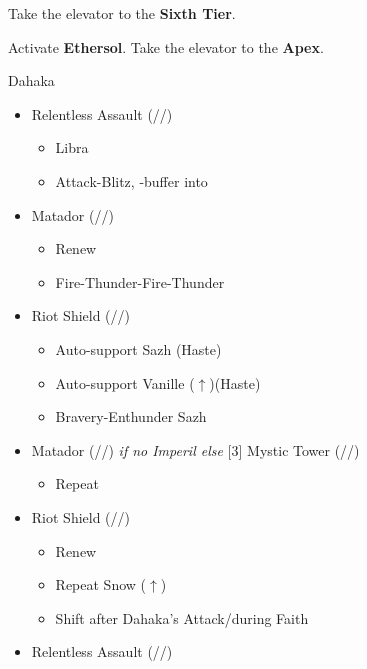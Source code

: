 	\renewcommand{\first}{[1] Riot Shield (\syn/\sen/\rav)}
	\renewcommand{\second}{[2] Relentless Assault (\com/\rav/\rav)}
	\renewcommand{\third}{[3] Mystic Tower (\rav/\sen/\rav)}
	\renewcommand{\fourth}{[4] Aggression (\com/\com/\rav)}
	\renewcommand{\fifth}{[5] Matador (\rav/\sen/\sab)}
	\renewcommand{\sixth}{[6] Aggression (\com/\com/\rav)}

	Take the elevator to the \textbf{Sixth Tier}.

	Activate \textbf{Ethersol}.
	Take the elevator to the \textbf{Apex}.

	\begin{battle}[1:30]{Dahaka}
		\begin{itemize}
			\item \second
			      \begin{itemize}
				      \item Libra
				      \item Attack-Blitz, \rav-buffer into
			      \end{itemize}
			\item \fifth
			      \begin{itemize}
				      \item Renew
				      \item Fire-Thunder-Fire-Thunder
			      \end{itemize}
			\item \first
			      \begin{itemize}
				      \item Auto-support Sazh (Haste)
				      \item Auto-support Vanille ($\uparrow$)(Haste)
				      \item Bravery-Enthunder Sazh
			      \end{itemize}
			\item \fifth \textit{ if no Imperil else } \third
			      \begin{itemize}
				      \item Repeat
			      \end{itemize}
			\item \first
			      \begin{itemize}
				      \item Renew
				      \item Repeat Snow ($\uparrow$)
				      \item Shift after Dahaka's Attack/during Faith
			      \end{itemize}
			\item \second
			      \begin{itemize}

\end{itemize}
\end{itemize}
\end{battle}
